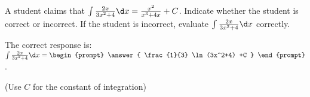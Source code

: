 \documentclass{ximera}
\author{Jim Talamo}
\begin{document}
\begin{exercise}
A student claims that $\int \frac{2x}{3x^2+4} \d x = \frac{x^2}{x^3+4x}+C$.  Indicate whether the student is correct or incorrect.  If the student is incorrect, evaluate $\int \frac{2x}{3x^2+4} \d x$ correctly.

\begin{multipleChoice}  

The correct response is: $\int \frac{2x}{3x^2+4} \d x = \begin{prompt} \answer{ \frac{1}{3} \ln(3x^2+4) +C } \end{prompt} $.
\end{multipleChoice}

\begin{prompt} (Use $C$ for the constant of integration) \end{prompt}

\end{exercise}
\end{document}
